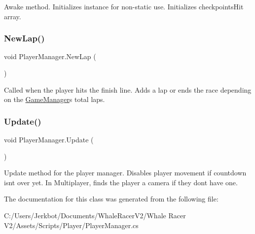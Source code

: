 Awake method. Initializes instance for non-\/static use. Initializes checkpoints\+Hit array. 

\mbox{\label{class_player_manager_afc42c9dacfdfdf7a707f49591c1b4ace}} 
\subsubsection{\texorpdfstring{New\+Lap()}{NewLap()}}
{\footnotesize\ttfamily void Player\+Manager.\+New\+Lap (\begin{DoxyParamCaption}{ }\end{DoxyParamCaption})}



Called when the player hits the finish line. Adds a lap or ends the race depending on the \hyperlink{class_game_manager}{Game\+Manager}\textquotesingle{}s total laps. 

\mbox{\label{class_player_manager_a845f49f829496d56defe86c77e03fa12}} 
\subsubsection{\texorpdfstring{Update()}{Update()}}
{\footnotesize\ttfamily void Player\+Manager.\+Update (\begin{DoxyParamCaption}{ }\end{DoxyParamCaption})\hspace{0.3cm}{\ttfamily [private]}}



Update method for the player manager. Disables player movement if countdown isn\textquotesingle{}t over yet. In Multiplayer, finds the player a camera if they don\textquotesingle{}t have one. 



The documentation for this class was generated from the following file\+:\begin{DoxyCompactItemize}
\item 
C\+:/\+Users/\+Jerkbot/\+Documents/\+Whale\+Racer\+V2/\+Whale Racer V2/\+Assets/\+Scripts/\+Player/Player\+Manager.\+cs\end{DoxyCompactItemize}
